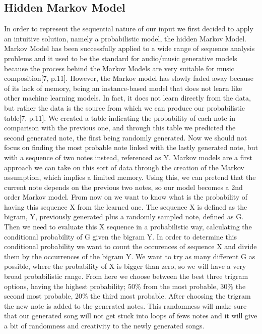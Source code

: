 \documentclass[12pt]{article}
\begin{document}
\subsection*{Hidden Markov Model}
  \begin{flushright}
    \begin{minipage}[t]{0.96\linewidth}
       In order to represent the sequential nature of our input we first decided to apply an intuitive solution, namely a probabilistic model, the hidden Markov Model. Markov Model has been successfully applied to a wide range of sequence analysis problems and it used to be the standard for audio/music generative models because the process behind the Markov Models are very suitable for music composition[7, p.11]. However, the Markov model has slowly faded away because of its lack of memory, being an instance-based model that does not learn like other machine learning models. In fact, it does not learn directly from the data, but rather the data is the source from which we can produce our probabilistic table[7, p.11]. We created a table indicating the probability of each note in comparison with the previous one, and through this table we predicted the second generated note, the first being randomly generated. Now we should not focus on finding the most probable note linked with the lastly generated note, but with a sequence of two notes instead, referenced as Y. Markov models are a first approach we can take on this sort of data through the creation of the Markov assumption, which implies a limited memory. Using this, we can pretend that the current note depends on the previous two notes, so our model becomes a 2nd order Markov model. From now on we want to know what is the probability of having this sequence X from the learned one. The sequence X is defined as the bigram, Y, previously generated plus a randomly sampled note, defined as G. Then we need to evaluate this X sequence in a probabilistic way, calculating the conditional probability of G given the bigram Y. In order to determine this conditional probability we want to count the occurences of sequence X and divide them by the occurrences of the bigram Y. We want to try as many different G as possible, where the probability of X is bigger than zero, so we will have a very broad probabilistic range. From here we choose between the best three trigram options, having the highest probability; 50\% from the most probable, 30\% the second most probable, 20\% the third most probable. After choosing the trigram the new note is added to the generated notes. This randomness will make sure that our generated song will not get stuck into loops of fews notes and it will give a bit of randomness and creativity to the newly generated songs.
    \end{minipage}
  \end{flushright}
\end{document}
